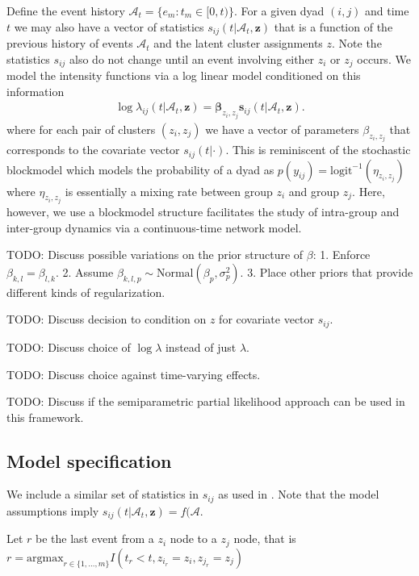 \documentclass[11pt]{article}
\begin{document}
Define the event history $\mathcal{A}_t = \{e_m: t_m \in [0,t)\}$.
For a given dyad $(i,j)$ and time $t$ we may also have a vector of statistics $s_{ij}(t|\mathcal{A}_t,\mathbf{z})$ that is a function of the previous history of events $\mathcal{A}_t$ and the latent cluster assignments $z$.  Note the statistics $s_{ij}$ also do not change until an event involving either $z_i$ or $z_j$ occurs.  We model the intensity functions via a log linear model conditioned on this information
\begin{align}
\log \lambda_{ij}(t | \mathcal{A}_t,\mathbf{z}) = \boldsymbol{\beta}_{z_i,z_j} \mathbf{s}_{ij}(t|\mathcal{A}_t,\mathbf{z}).
\end{align}
where for each pair of clusters $(z_i,z_j)$ we have a vector of parameters $\beta_{z_i,z_j}$ that corresponds to the covariate vector $s_{ij}(t|\cdot)$.  This is reminiscent of the stochastic blockmodel \cite{Nowicki2001, Kemp2006} which models the probability of a dyad as $p(y_{ij}) =\mbox{logit}^{-1}( \eta_{z_i,z_j})$ where $\eta_{z_i,z_j}$ is essentially a mixing rate between group $z_i$ and group $z_j$.  Here, however, we use a blockmodel structure facilitates the study of intra-group and inter-group dynamics via a continuous-time network model.

TODO: Discuss possible variations on the prior structure of $\beta$: 1. Enforce $\beta_{k,l} = \beta_{l,k}$. 2. Assume $\beta_{k,l,p} \sim \mbox{Normal}(\beta_p,\sigma_p^2)$. 3. Place other priors that provide different kinds of regularization. 

TODO: Discuss decision to condition on $z$ for covariate vector $s_{ij}$.

TODO: Discuss choice of $\log \lambda$ instead of just $\lambda$.

TODO: Discuss choice against time-varying effects.

TODO: Discuss if the semiparametric partial likelihood approach can be used in this framework.

\subsection{Model specification}

We include a similar set of statistics in $s_{ij}$ as used in \cite{Butts2008,Vuy2011}.
Note that the model assumptions imply $s_{ij}(t|\mathcal{A}_t,\mathbf{z}) = f(\mathcal{A}$.

Let $r$ be the last event from a $z_i$ node to a $z_j$ node, that is $r = \mbox{argmax}_{r \in \{1, \ldots, m\}}I(t_r < t, z_{i_r} = z_i, z_{j_r} = z_j)$
\end{document}

